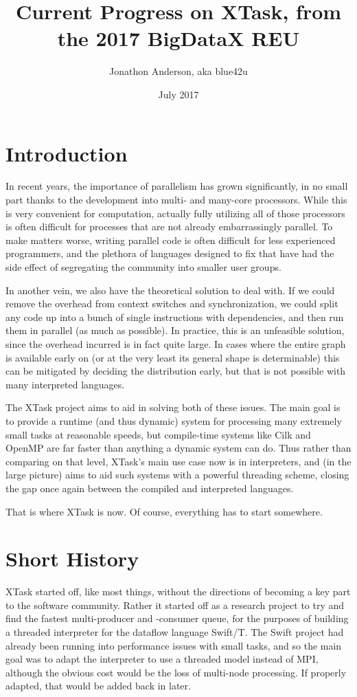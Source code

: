 \documentclass{article}
\title{Current Progress on XTask, from the 2017 BigDataX REU}
\author{Jonathon Anderson, aka blue42u}
\date{July 2017}
\begin{document}
\maketitle

\section{Introduction}
In recent years, the importance of parallelism has grown significantly, in no small part thanks to the development into multi- and many-core processors. While this is very convenient for computation, actually fully utilizing all of those processors is often difficult for processes that are not already embarrassingly parallel. To make matters worse, writing parallel code is often difficult for less experienced programmers, and the plethora of languages designed to fix that have had the side effect of segregating the community into smaller user groups.

In another vein, we also have the theoretical solution to deal with. If we could remove the overhead from context switches and synchronization, we could split any code up into a bunch of single instructions with dependencies, and then run them in parallel (as much as possible). In practice, this is an unfeasible solution, since the overhead incurred is in fact quite large. In cases where the entire graph is available early on (or at the very least its general shape is determinable) this can be mitigated by deciding the distribution early, but that is not possible with many interpreted languages.

The XTask project aims to aid in solving both of these issues. The main goal is to provide a runtime (and thus dynamic) system for processing many extremely small tasks at reasonable speeds, but compile-time systems like Cilk and OpenMP are far faster than anything a dynamic system can do. Thus rather than comparing on that level, XTask's main use case now is in interpreters, and (in the large picture) aims to aid such systems with a powerful threading scheme, closing the gap once again between the compiled and interpreted languages.

That is where XTask is now. Of course, everything has to start somewhere.

\section{Short History}
XTask started off, like most things, without the directions of becoming a key part to the software community. Rather it started off as a research project to try and find the fastest multi-producer and -consumer queue, for the purposes of building a threaded interpreter for the dataflow language Swift/T. The Swift project had already been running into performance issues with small tasks, and so the main goal was to adapt the interpreter to use a threaded model instead of MPI, although the obvious cost would be the loss of multi-node processing. If properly adapted, that would be added back in later.
\end{document}
